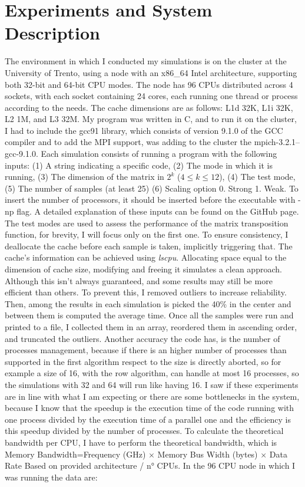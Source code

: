 \section{Experiments and System Description}
The environment in which I conducted my simulations is on the cluster at the University of Trento, using a node with an x86\_64 Intel architecture, supporting both 32-bit and 64-bit CPU modes. The node has 96 CPUs distributed across 4 sockets, with each socket containing 24 cores, each running one thread or process according to the needs. The cache dimensions are as follows: L1d 32K, L1i 32K, L2 1M, and L3 32M. My program was written in C, and to run it on the cluster, I had to include the gcc91 library, which consists of version 9.1.0 of the GCC compiler and to add the MPI support, was adding to the cluster the mpich-3.2.1--gcc-9.1.0.
Each simulation consists of running a program with the following inputs: (1) A string indicating a specific code, (2) The mode in which it is running, (3) The dimension of the matrix in $2^k$ ($4 \leq k \leq 12$), (4) The test mode, (5) The number of samples (at least 25) (6) Scaling option 0. Strong 1. Weak. To insert the number of processors, it should be inserted before the executable with -np flag. A detailed explanation of these inputs can be found on the GitHub page. The test modes are used to assess the performance of the matrix transposition function, for brevity, I will focus only on the first one. To ensure consistency, I deallocate the cache before each sample is taken, implicitly triggering that. The cache’s information can be achieved using \textit{lscpu}. Allocating space equal to the dimension of cache size, modifying and freeing it simulates a clean approach. Although this isn't always guaranteed, and some results may still be more efficient than others. To prevent this, I removed outliers to increase reliability. Then, among the results in each simulation is picked the 40\% in the center and between them is computed the average time. Once all the samples were run and printed to a file, I collected them in an array, reordered them in ascending order, and truncated the outliers. Another accuracy the code has, is the number of processes management, because if there is an higher number of processes than supported in the first algorithm respect to the size is directly aborted, so for example a size of 16, with the row algorithm, can handle at most 16 processes, so the simulations with 32 and 64 will run like having 16. 
I saw if these experiments are in line with what I am expecting or there are some bottlenecks in the system, because I know that the speedup is the execution time of the code running with one process divided by the execution time of a parallel one and the efficiency is this speedup divided by the number of processes. To calculate the theoretical bandwidth per CPU, I have to perform the theoretical bandwidth, which is Memory Bandwidth=Frequency (GHz) $\times$ Memory Bus Width (bytes) $\times$ Data Rate Based on provided architecture / n° CPUs. In the 96 CPU node in which I was running the data are:

